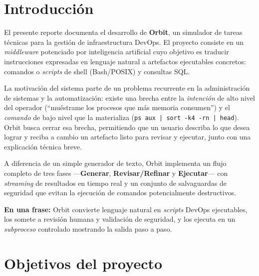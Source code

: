 \documentclass[12pt,a4paper]{article}
\begin{document}
\tableofcontents
\newpage

\section{Introducción}

El presente reporte documenta el desarrollo de \textbf{Orbit}, un simulador de
tareas técnicas para la gestión de infraestructura DevOps. El proyecto consiste
en un \textit{middleware} potenciado por inteligencia artificial cuyo objetivo
es traducir instrucciones expresadas en lenguaje natural a artefactos
ejecutables concretos: comandos o \textit{scripts} de shell (Bash/POSIX) y
consultas SQL.

La motivación del sistema parte de un problema recurrente en la administración
de sistemas y la automatización: existe una brecha entre la \textit{intención}
de alto nivel del operador (``muéstrame los procesos que más memoria consumen'')
y el \textit{comando} de bajo nivel que la materializa
(\texttt{ps aux | sort -k4 -rn | head}). Orbit busca cerrar esa brecha,
permitiendo que un usuario describa lo que desea lograr y reciba a cambio un
artefacto listo para revisar y ejecutar, junto con una explicación técnica
breve.

A diferencia de un simple generador de texto, Orbit implementa un flujo
completo de tres fases —\textbf{Generar}, \textbf{Revisar/Refinar} y
\textbf{Ejecutar}— con \textit{streaming} de resultados en tiempo real y un
conjunto de salvaguardas de seguridad que evitan la ejecución de comandos
potencialmente destructivos.

\begin{cajainfo}
\textbf{En una frase:} Orbit convierte lenguaje natural en \textit{scripts}
DevOps ejecutables, los somete a revisión humana y validación de seguridad, y
los ejecuta en un \textit{subproceso} controlado mostrando la salida paso a
paso.
\end{cajainfo}

\section{Objetivos del proyecto}
\end{document}
